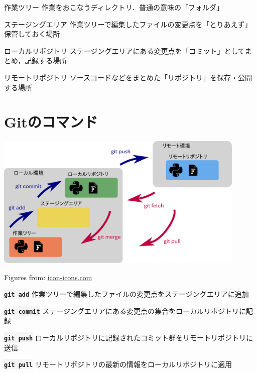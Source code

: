 \documentclass[12pt,dvipdfmx,svgnames,uplatex,aspectratio=169]{beamer}
\newcommand{\git}[1]{{\colorbox{WhiteSmoke}{\texttt{\textbf{#1}}}}}  %
\begin{document}
\begin{frame}{\insertsection}
  \begin{block}{作業ツリー}
    作業をおこなうディレクトリ．普通の意味の「フォルダ」
  \end{block}
  \begin{block}{ステージングエリア}
    作業ツリーで編集したファイルの変更点を「とりあえず」保管しておく場所
  \end{block}
  \begin{block}{ローカルリポジトリ}
    ステージングエリアにある変更点を「コミット」としてまとめ，記録する場所
  \end{block}
  \begin{block}{リモートリポジトリ}
    ソースコードなどをまとめた「リポジトリ」を保存・公開する場所
  \end{block}
\end{frame}

\section{Gitのコマンド}
\begin{frame}{\insertsection}
  \centering
  \includegraphics[bb=0.000000 0.000000 979.966736 524.329163, width=120mm]{./pics/git_structure_command.pdf}
  \begin{flushright}
    \scriptsize{Figures from: \href{https://icon-icons.com/ja/}{icon-icons.com}}
  \end{flushright}
\end{frame}

\begin{frame}{\insertsection}
  \begin{block}{\git{git add}}
    作業ツリーで編集したファイルの変更点をステージングエリアに追加
  \end{block}
  \begin{block}{\git{git commit}}
    ステージングエリアにある変更点の集合をローカルリポジトリに記録
  \end{block}
  \begin{block}{\git{git push}}
    ローカルリポジトリに記録されたコミット群をリモートリポジトリに送信
  \end{block}
  \begin{block}{\git{git pull}}
    リモートリポジトリの最新の情報をローカルリポジトリに適用
  \end{block}
\end{frame}
\end{document}
